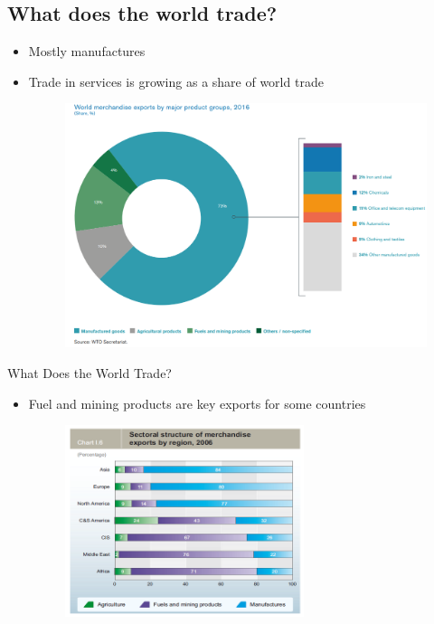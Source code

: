 \documentclass[10pt,hyperref={CJKbookmarks=true},xcolor=dvipsnames,aspectratio=169]{beamer}
\begin{document}
\subsection[贸易的产品结构]{What does the world trade?}



\begin{frame}
\begin{itemize}
	\item Mostly manufactures 
	\item Trade in services is growing as a share of world trade 
	\begin{figure}
		\includegraphics[scale=0.3]{fig/gravity/tra1}
		
	\end{figure}
	
\end{itemize}
\end{frame}

\begin{frame}{What Does the World Trade?}

\begin{itemize}
\item Fuel and mining products are key exports for some countries
\begin{figure}
	\begin{centering}
		\includegraphics[width=7cm]{fig/gravity/tra2}
		\par\end{centering}
	
\end{figure}

\end{itemize}
\end{frame}
\end{document}
